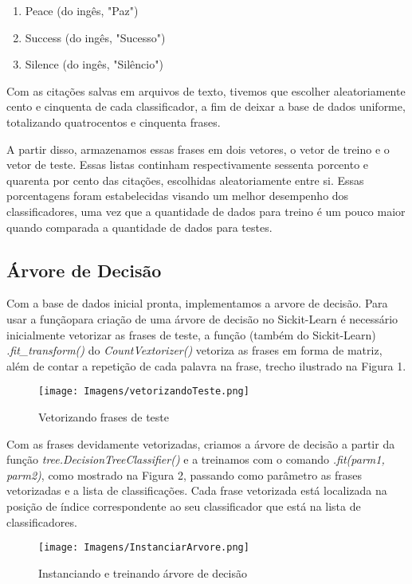 \documentclass[preprint,12pt,times]{elsarticle}
\begin{document}
	\begin{enumerate}
		\item Peace (do ingês, "Paz")
		\item Success (do ingês, "Sucesso")
		\item Silence (do ingês, "Silêncio")
	\end{enumerate}
	
	Com as citações salvas em arquivos de texto, tivemos que escolher aleatoriamente cento e cinquenta de cada classificador, a fim de deixar a base de dados uniforme, totalizando quatrocentos e cinquenta frases.
	
	A partir disso, armazenamos essas frases em dois vetores, o vetor de treino e o vetor de teste. Essas listas continham respectivamente sessenta porcento e quarenta por cento das citações, escolhidas aleatoriamente entre si. Essas porcentagens foram estabelecidas visando um melhor desempenho dos classificadores, uma vez que a quantidade de dados para treino é um pouco maior quando comparada a quantidade de dados para testes.
	
	\subsection{Árvore de Decisão}
	
	Com a base de dados inicial pronta, implementamos a arvore de decisão. Para usar a funçãopara criação de uma árvore de decisão no Sickit-Learn é necessário inicialmente vetorizar as frases de teste, a função (também do Sickit-Learn) \textit{.fit\_transform()} do \textit{CountVextorizer()} vetoriza as frases em forma de matriz, além de contar a repetição de cada palavra na frase, trecho ilustrado na Figura 1. 
	
	\begin{figure}[h]
		\centering\texttt{[image: Imagens/vetorizandoTeste.png]}
		\caption{Vetorizando frases de teste}
	\end{figure}
	
	 Com as frases devidamente vetorizadas, criamos a árvore de decisão a partir da função \textit{tree.DecisionTreeClassifier()} e a treinamos com o comando \textit{.fit(parm1, parm2)}, como mostrado na Figura 2, passando como parâmetro as frases vetorizadas e a lista de classificações. Cada frase vetorizada está localizada na posição de índice correspondente ao seu classificador que está na lista de classificadores.
	 
	 \begin{figure}[h]
		 \centering\texttt{[image: Imagens/InstanciarArvore.png]}
	 	\caption{Instanciando e treinando árvore de decisão}
	 \end{figure}
	
\end{document}
